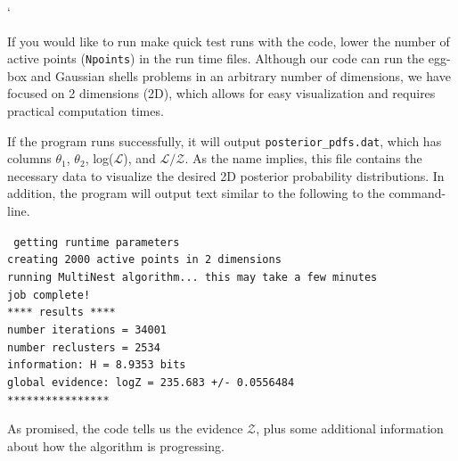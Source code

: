 `\documentclass{article}
\begin{document}
\noindent If you would like to run make quick test runs with the code, lower the number of active points ({\tt Npoints}) in the run time files. Although our code can run the egg-box and Gaussian shells problems in an arbitrary number of dimensions, we have focused on 2 dimensions (2D), which allows for easy visualization and requires practical computation times. 

If the program runs successfully, it will output {\tt posterior\_pdfs.dat}, which has columns  $\theta_1$, $\theta_2$, log($\mathcal{L}$), and $\mathcal{L/Z}$. As the name implies, this file contains the necessary data to visualize the desired 2D posterior probability distributions. In addition, the program will output text similar to the following to the command-line. 

\begin{adjustwidth*}{1.2cm}{1.2cm}
{\tt
getting runtime parameters\\
creating 2000 active points in 2 dimensions\\
running MultiNest algorithm... this may take a few minutes\\
job complete!\\
**** results ****\\
number iterations = 34001\\
number reclusters = 2534\\
information: H =  8.9353 bits\\
global evidence: logZ = 235.683 +/- 0.0556484\\
****************}
\end{adjustwidth*}

As promised, the code tells us the evidence $\mathcal{Z}$, plus some additional information about how the algorithm is progressing. 



\end{document}
